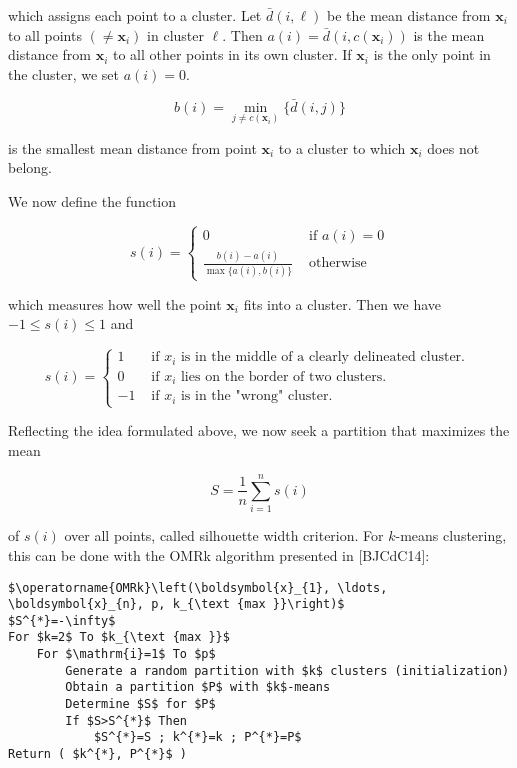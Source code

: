 \documentclass[10pt]{article}
\begin{document}
which assigns each point to a cluster. Let $\bar{d}(i, \ell)$ be the mean distance from $\boldsymbol{x}_{i}$ to all points $\left(\neq \boldsymbol{x}_{i}\right)$ in cluster $\ell$. Then $a(i)=\bar{d}\left(i, c\left(\boldsymbol{x}_{i}\right)\right)$ is the mean distance from $\boldsymbol{x}_{i}$ to all other points in its own cluster. If $\boldsymbol{x}_{i}$ is the only point in the cluster, we set $a(i)=0$.

$$
b(i)=\min _{j \neq c\left(\boldsymbol{x}_{i}\right)}\{\bar{d}(i, j)\}
$$

is the smallest mean distance from point $\boldsymbol{x}_{i}$ to a cluster to which $\boldsymbol{x}_{i}$ does not belong.

We now define the function

$$
s(i)=\left\{\begin{array}{cc}
0 & \text { if } a(i)=0 \\
\frac{b(i)-a(i)}{\max \{a(i), b(i)\}} & \text { otherwise }
\end{array}\right.
$$

which measures how well the point $\boldsymbol{x}_{i}$ fits into a cluster. Then we have $-1 \leq s(i) \leq 1$ and

$$
s(i)= \begin{cases}1 & \text { if } x_{i} \text { is in the middle of a clearly delineated cluster. } \\ 0 & \text { if } x_{i} \text { lies on the border of two clusters. } \\ -1 & \text { if } x_{i} \text { is in the "wrong" cluster. }\end{cases}
$$

Reflecting the idea formulated above, we now seek a partition that maximizes the mean

$$
S=\frac{1}{n} \sum_{i=1}^{n} s(i)
$$

of $s(i)$ over all points, called silhouette width criterion. For $k$-means clustering, this can be done with the OMRk algorithm presented in [BJCdC14]:

\begin{verbatim}
$\operatorname{OMRk}\left(\boldsymbol{x}_{1}, \ldots, \boldsymbol{x}_{n}, p, k_{\text {max }}\right)$
$S^{*}=-\infty$
For $k=2$ To $k_{\text {max }}$
    For $\mathrm{i}=1$ To $p$
        Generate a random partition with $k$ clusters (initialization)
        Obtain a partition $P$ with $k$-means
        Determine $S$ for $P$
        If $S>S^{*}$ Then
            $S^{*}=S ; k^{*}=k ; P^{*}=P$
Return ( $k^{*}, P^{*}$ )
\end{verbatim}
\end{document}

